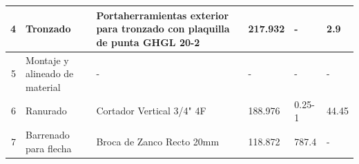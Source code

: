 \begin{table}[H]
\begin{tabular}{|r|p{10.75em}|p{11em}|p{3em}|p{3.25em}|p{3.5em}|}
     \hline
     \scriptsize 4     & \scriptsize Tronzado & \scriptsize Portaherramientas exterior para tronzado con plaquilla de punta GHGL 20-2 & \scriptsize 217.932 & \scriptsize - & \scriptsize 2.9 \\
     \hline
    \scriptsize 5     & \scriptsize Montaje y alineado de material & \scriptsize -     & \scriptsize {-} & \scriptsize{-} & \scriptsize - \\
    \hline
     \scriptsize 6     & \scriptsize Ranurado & \scriptsize Cortador Vertical 3/4" 4F & \scriptsize 188.976 & \scriptsize 0.25-1 & \scriptsize 44.45 \\
    \hline
    \scriptsize 7     & \scriptsize Barrenado para flecha & \scriptsize Broca de Zanco Recto 20mm & \scriptsize 118.872 & \scriptsize 787.4 & \scriptsize - \\
    \hline
    \end{tabular}%
  \label{tab:TA_MC6}%
\end{table}%


